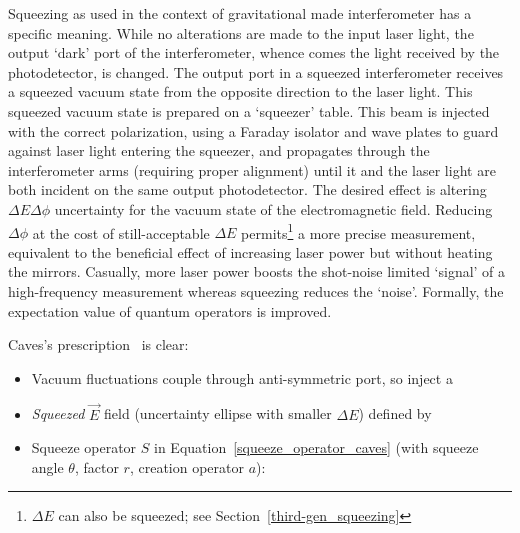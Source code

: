 


Squeezing as used in the context of gravitational made interferometer has a specific meaning.
While no alterations are made to the input laser light, the output `dark' port of the interferometer, whence comes the light received by the photodetector, is changed.
The output port in a squeezed interferometer receives a squeezed vacuum state from the opposite direction to the laser light.
This squeezed vacuum state is prepared on a `squeezer' table.
This beam is injected with the correct polarization, using a Faraday isolator and wave plates to guard against laser light entering the squeezer, and propagates through the interferometer arms (requiring proper alignment) until it and the laser light are both incident on the same output photodetector.
The desired effect is altering $\Delta E\Delta\phi$ uncertainty for the vacuum state of the electromagnetic field.
Reducing $\Delta \phi$ at the cost of still-acceptable $\Delta E$ permits\footnote{$\Delta E$ can also be squeezed; see Section~\ref{third-gen_squeezing}} a more precise measurement, equivalent to the beneficial effect of increasing laser power but without heating the mirrors.
Casually, more laser power boosts the shot-noise limited `signal' of a high-frequency measurement whereas squeezing reduces the `noise'. 
Formally, the expectation value of quantum operators is improved.


Caves's prescription~\cite{Caves1981} is clear:
\begin{itemize}
\item Vacuum fluctuations couple through anti-symmetric port, so inject a
\item \emph{Squeezed } $\overrightarrow{E}$ field (uncertainty ellipse with smaller $\Delta E$) defined by
\item Squeeze operator $S$ in Equation~\ref{squeeze_operator_caves} (with squeeze angle $\theta$, factor $r$, creation operator $a$):
\end{itemize}

